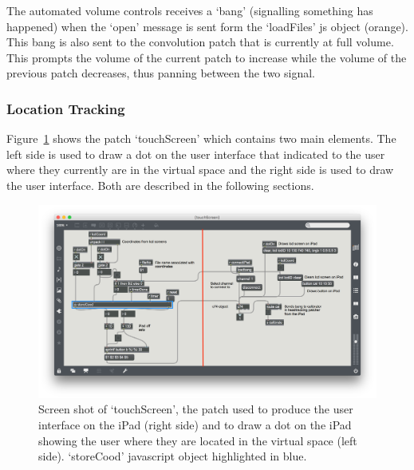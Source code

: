 \documentclass[../../main.tex]{subfiles}
\begin{document}
		 	The automated volume controls receives a `bang' (signalling something has happened) when the `open' message is sent form the `loadFiles' js object (orange). This bang is also sent to the convolution patch that is currently at full volume. This prompts the volume of the current patch to increase while the volume of the previous patch decreases, thus panning between the two signal.


	\subsubsection{Location Tracking}
	\label{locationtracking}
	Figure~\ref{touchScreenPatch} shows the patch `touchScreen' which contains two main elements. The left side is used to draw a dot on the user interface that indicated to the user where they currently are in the virtual space and the right side is used to draw the user interface. Both are described in the following sections.

		\begin{figure}[H]
			\centerline{\includegraphics[scale = 0.5]{Sections/Implementation/Max/images/Max/UserInterface/pTouchScreen_edit.png}}
			\caption{Screen shot of `touchScreen', the patch used to produce the user interface on the iPad (right side) and to draw a dot on the iPad showing the user where they are located in the virtual space (left side). `storeCood' javascript object highlighted in blue.}
			\label{touchScreenPatch}
		\end{figure}
\end{document}
